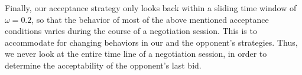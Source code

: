 Finally, our acceptance strategy only looks back within a sliding time window of $\omega = 0.2$, so that the behavior of most of the above mentioned acceptance conditions varies during the course of a negotiation session. This is to accommodate for changing behaviors in our and the opponent's strategies. Thus, we never look at the entire time line of a negotiation session, in order to determine the acceptability of the opponent's last bid.